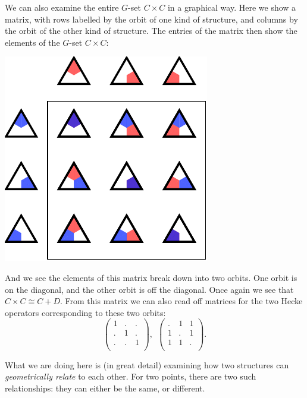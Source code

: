 \documentclass[11pt,oneside]{article}
\begin{document}
We can also examine the entire $G$-set $C\times C$ in a graphical way.
Here we show a matrix, with rows labelled by the orbit of one kind of
structure, and columns by the orbit of the other kind of structure.
The entries of the matrix then show the elements of the $G$-set $C\times C:$
\begin{center}
\includegraphics[]{pic-triangle-point-point-matrix.pdf} 
\end{center}
And we see the elements of this matrix break down into two
orbits. One orbit is on the diagonal,
and the other orbit is off the diagonal.
Once again we see that $C\times C \cong C+D.$
From this matrix we can also read off matrices for the two Hecke
operators corresponding to these two orbits:
$$
\left( \begin{array}{ccc}
1 & . & . \\
. & 1 & . \\
. & . & 1 \\
\end{array} \right),\ \ 
\left( \begin{array}{ccc}
. & 1 & 1 \\
1 & . & 1 \\
1 & 1 & . \\
\end{array} \right).
$$

What we are doing here is (in great detail) examining how
two structures can \emph{geometrically relate} to each other.
For two points, there are two such relationships:
they can either be the same, or different.
\end{document}
